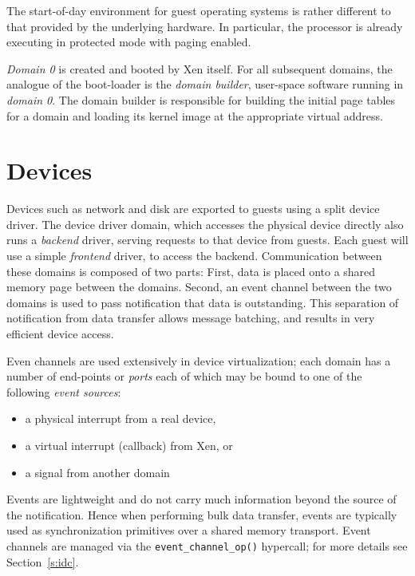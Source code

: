 \documentclass[11pt,twoside,final,openright]{report}
\begin{document}
The start-of-day environment for guest operating systems is rather
different to that provided by the underlying hardware. In particular,
the processor is already executing in protected mode with paging
enabled.

{\it Domain 0} is created and booted by Xen itself. For all subsequent
domains, the analogue of the boot-loader is the {\it domain builder},
user-space software running in {\it domain 0}. The domain builder 
is responsible for building the initial page tables for a domain  
and loading its kernel image at the appropriate virtual address. 



\chapter{Devices}
\label{c:devices}

Devices such as network and disk are exported to guests using a
split device driver.  The device driver domain, which accesses the
physical device directly also runs a {\em backend} driver, serving
requests to that device from guests.  Each guest will use a simple
{\em frontend} driver, to access the backend.  Communication between these
domains is composed of two parts:  First, data is placed onto a shared
memory page between the domains.  Second, an event channel between the
two domains is used to pass notification that data is outstanding.
This separation of notification from data transfer allows message
batching, and results in very efficient device access.  

Even channels are used extensively in device virtualization; each
domain has a number of end-points or \emph{ports} each of which
may be bound to one of the following \emph{event sources}:
\begin{itemize} 
  \item a physical interrupt from a real device, 
  \item a virtual interrupt (callback) from Xen, or 
  \item a signal from another domain 
\end{itemize}

Events are lightweight and do not carry much information beyond 
the source of the notification. Hence when performing bulk data
transfer, events are typically used as synchronization primitives
over a shared memory transport. Event channels are managed via 
the {\tt event\_channel\_op()} hypercall; for more details see
Section~\ref{s:idc}. 
\end{document}
